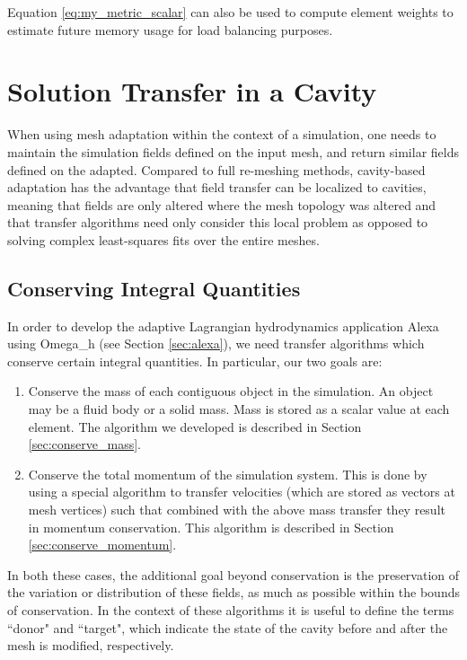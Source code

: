 Equation \ref{eq:my_metric_scalar} can also be used to compute element weights
to estimate future memory usage for load balancing purposes.

\section{Solution Transfer in a Cavity}

When using mesh adaptation within the context of a simulation,
one needs to maintain the simulation fields defined on the input mesh,
and return similar fields defined on the adapted.
Compared to full re-meshing methods, cavity-based adaptation has the
advantage that field transfer can be localized to cavities, meaning
that fields are only altered where the mesh topology was altered and
that transfer algorithms need only consider this local problem
as opposed to solving complex least-squares fits over the entire meshes.

\subsection{Conserving Integral Quantities}

In order to develop the adaptive Lagrangian hydrodynamics application Alexa
using Omega\_h (see Section \ref{sec:alexa}), we need transfer algorithms
which conserve certain integral quantities.
In particular, our two goals are:
\begin{enumerate}
\item Conserve the mass of each contiguous object in the simulation.
An object may be a fluid body or a solid mass.
Mass is stored as a scalar value at each element.
The algorithm we developed is described in Section \ref{sec:conserve_mass}.
\item Conserve the total momentum of the simulation system.
This is done by using a special algorithm to transfer velocities
(which are stored as vectors at mesh vertices) such that combined
with the above mass transfer they result in momentum conservation.
This algorithm is described in Section \ref{sec:conserve_momentum}.
\end{enumerate}
In both these cases, the additional goal beyond conservation is
the preservation of the variation or distribution of these fields,
as much as possible within the bounds of conservation.
In the context of these algorithms it is useful to define the terms
``donor" and ``target", which indicate the state of the cavity before
and after the mesh is modified, respectively.

